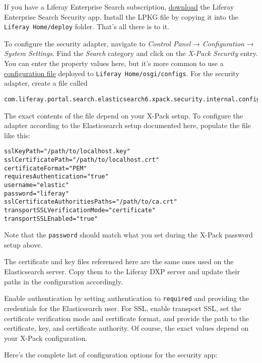 If you have a Liferay Enterprise Search subscription,
\href{https://web.liferay.com/group/customer/dxp/downloads/enterprise-search}{download}
the Liferay Enterprise Search Security app. Install the LPKG file by
copying it into the \texttt{Liferay\ Home/deploy} folder. That's all
there is to it.

To configure the security adapter, navigate to \emph{Control Panel} →
\emph{Configuration} → \emph{System Settings}. Find the \emph{Search}
category and click on the \emph{X-Pack Security} entry. You can enter
the property values here, but it's more common to use a
\href{/docs/7-1/user/-/knowledge_base/u/understanding-system-configuration-files}{configuration
file} deployed to \texttt{Liferay\ Home/osgi/configs}. For the security
adapter, create a file called

\begin{verbatim}
com.liferay.portal.search.elasticsearch6.xpack.security.internal.configuration.XPackSecurityConfiguration.config
\end{verbatim}

The exact contents of the file depend on your X-Pack setup. To configure
the adapter according to the Elasticsearch setup documented here,
populate the file like this:

\begin{verbatim}
sslKeyPath="/path/to/localhost.key"
sslCertificatePath="/path/to/localhost.crt"
certificateFormat="PEM"
requiresAuthentication="true"
username="elastic"
password="liferay"
sslCertificateAuthoritiesPaths="/path/to/ca.crt"
transportSSLVerificationMode="certificate"
transportSSLEnabled="true"
\end{verbatim}

Note that the \texttt{password} should match what you set during the
X-Pack password setup above.

The certificate and key files referenced here are the same ones used on
the Elasticsearch server. Copy them to the Liferay DXP server and update
their paths in the configuration accordingly.

Enable authentication by setting authentication to \texttt{required} and
providing the credentials for the Elasticsearch user. For SSL, enable
transport SSL, set the certificate verification mode and certificate
format, and provide the path to the certificate, key, and certificate
authority. Of course, the exact values depend on your X-Pack
configuration.

Here's the complete list of configuration options for the security app:

